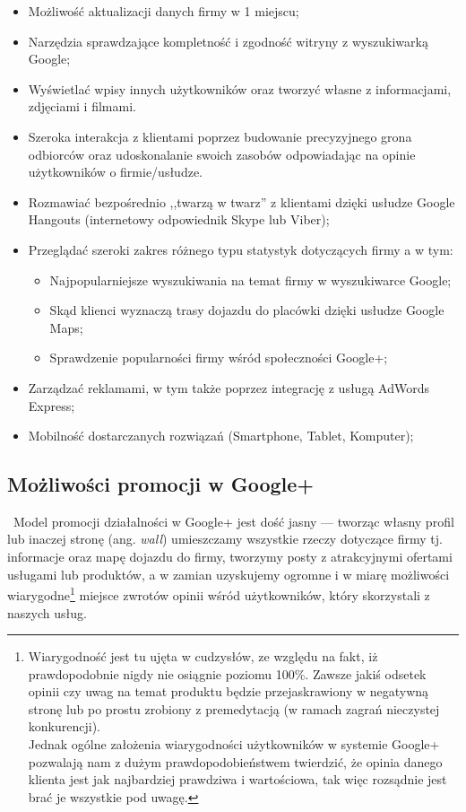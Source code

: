 \begin{itemize}
\item Możliwość aktualizacji danych firmy w 1 miejscu;

\item Narzędzia sprawdzające kompletność i zgodność witryny z wyszukiwarką \mbox{Google};

\item Wyświetlać wpisy innych użytkowników oraz tworzyć własne z informacjami, zdjęciami i filmami.

\item Szeroka interakcja z klientami poprzez budowanie precyzyjnego grona odbiorców oraz udoskonalanie swoich zasobów odpowiadając na opinie użytkowników o firmie/usłudze.

\item Rozmawiać bezpośrednio ,,twarzą w twarz'' z klientami dzięki usłudze Google Hangouts (internetowy odpowiednik Skype lub Viber);

\item Przeglądać szeroki zakres różnego typu statystyk dotyczących firmy a w tym:
    \begin{itemize}
    \item Najpopularniejsze wyszukiwania na temat firmy w wyszukiwarce Google;
    \item Skąd klienci wyznaczą trasy dojazdu do placówki dzięki usłudze Google Maps;
    \item Sprawdzenie popularności firmy wśród społeczności Google+;
    \end{itemize}

\item Zarządzać reklamami, w tym także poprzez integrację z usługą AdWords Express;

\item Mobilność dostarczanych rozwiązań (Smartphone, Tablet, Komputer);
\end{itemize}


\subsection{Możliwości promocji w Google+}
\
Model promocji działalności w Google+ jest dość jasny --- tworząc własny profil lub inaczej stronę (ang. \textit{wall}) umieszczamy wszystkie rzeczy dotyczące firmy tj. informacje oraz mapę dojazdu do firmy, tworzymy posty z atrakcyjnymi ofertami usługami lub produktów, a w zamian uzyskujemy ogromne i w miarę możliwości wiarygodne\footnote{Wiarygodność jest tu ujęta w cudzysłów, ze względu na fakt, iż prawdopodobnie nigdy nie osiągnie poziomu 100\%. Zawsze jakiś odsetek opinii czy uwag na temat produktu będzie przejaskrawiony w negatywną stronę lub po prostu zrobiony z premedytacją (w ramach zagrań nieczystej konkurencji).\\ Jednak ogólne założenia wiarygodności użytkowników w systemie Google+ pozwalają nam z dużym prawdopodobieństwem twierdzić, że opinia danego klienta jest jak najbardziej prawdziwa i wartościowa, tak więc rozsądnie jest brać je wszystkie pod uwagę.} miejsce zwrotów opinii wśród użytkowników, który skorzystali z naszych usług. 


